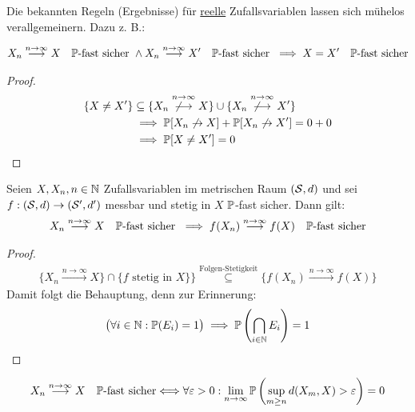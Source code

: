 Die bekannten Regeln (Ergebnisse) für \underline{reelle} Zufallsvariablen lassen sich mühelos verallgemeinern. Dazu z. B.:

\begin{satz}\label{Satz3.7} %
	\begin{align*}
		X_n
		\stackrel{n\to\infty}{\longrightarrow}
		X\quad\P\text{-fast sicher }\wedge
		X_n
		\stackrel{n\to\infty}{\longrightarrow}
		X'\quad\P\text{-fast sicher }
		\implies
		X=X'\quad\P\text{-fast sicher}
	\end{align*}
\end{satz}

\begin{proof}
	\begin{align*}
		\lbrace X\neq X'\rbrace
		&\subseteq\lbrace X_n
		\stackrel{n\to\infty}{\not\longrightarrow}
		X\rbrace
		\cup\lbrace X_n
		\stackrel{n\to\infty}{\not\longrightarrow}
		X'\rbrace\\
		&\implies
		\P[X_n\not\to X]+\P[X_n\not\to X']=0+0\\
		&\implies
		\P[X\neq X']=0
	\end{align*}
\end{proof}

\begin{satz}\label{Satz3.8} %
	Seien $X,X_n,n\in\N$ Zufallsvariablen im metrischen Raum $(\S,d)$ und sei $f:(\S,d)\to(\S',d')$ messbar und stetig in $X$ $\P$-fast sicher.
	Dann gilt:
	\begin{align*}
		X_n
		\stackrel{n\to\infty}{\longrightarrow}
		X\quad\P\text{-fast sicher }
		\implies
		f(X_n)
		\stackrel{n\to\infty}{\longrightarrow}
		f(X)\quad\P\text{-fast sicher}
	\end{align*}
\end{satz}

\begin{proof}
	\begin{align*}
		\lbrace X_n
		\stackrel{n\to\infty}{\longrightarrow}
		X\rbrace\cap\lbrace f\text{ stetig in }X\rbrace\rbrace
		\stackrel{\text{Folgen-Stetigkeit}}{\subseteq}
		\lbrace f(X_n)
		\stackrel{n\to\infty}{\longrightarrow}
		f(X)\rbrace
	\end{align*}
	Damit folgt die Behauptung, denn zur Erinnerung:
	\begin{align*}
		\big(\forall i\in\N:\P(E_i)=1\big)\implies\P\left(\bigcap\limits_{i\in\N} E_i\right)=1
	\end{align*}
\end{proof}

\begin{satz}\label{Satz3.9} %
	\begin{align*}
		X_n
		\stackrel{n\to\infty}{\longrightarrow}
		X\quad\P\text{-fast sicher}
		\Longleftrightarrow
		\forall\varepsilon>0:\limn\P\left(\sup\limits_{m\geq n} d(X_m,X)>\varepsilon\right)=0
	\end{align*}
\end{satz}

